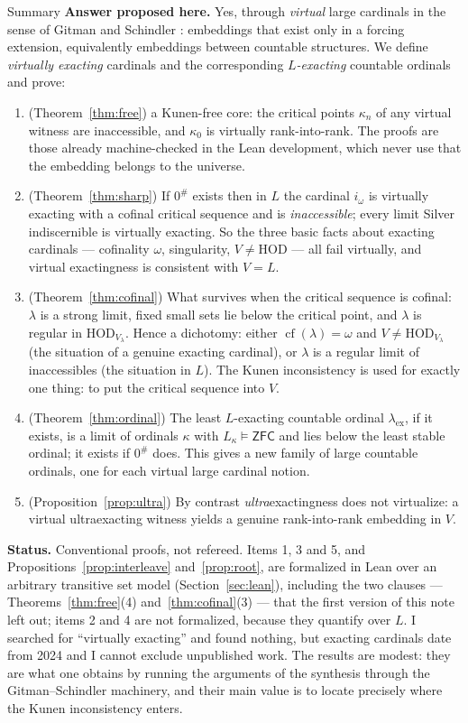 \documentclass[11pt,letterpaper]{article}
\theoremstyle{definition}
\numberwithin{equation}{section}
\newcommand{\ZFC}{\mathsf{ZFC}}
\newcommand{\HOD}{\mathrm{HOD}}
\newcommand{\cf}{\operatorname{cf}}
\begin{document}
\begin{assessment}{Summary}
\textbf{Answer proposed here.} Yes, through \emph{virtual} large cardinals in the sense of Gitman and Schindler \cite{gs}: embeddings that exist only in a forcing extension, equivalently embeddings between countable structures. We define \emph{virtually exacting} cardinals and the corresponding \emph{$L$-exacting} countable ordinals and prove:
\begin{enumerate}[leftmargin=1.6em,itemsep=1pt]
\item (Theorem~\ref{thm:free}) a Kunen-free core: the critical points $\kappa_n$ of any virtual witness are inaccessible, and $\kappa_0$ is virtually rank-into-rank. The proofs are those already machine-checked in the Lean development, which never use that the embedding belongs to the universe.
\item (Theorem~\ref{thm:sharp}) If $0^\#$ exists then in $L$ the cardinal $i_\omega$ is virtually exacting with a cofinal critical sequence and is \emph{inaccessible}; every limit Silver indiscernible is virtually exacting. So the three basic facts about exacting cardinals --- cofinality $\omega$, singularity, $V\ne\HOD$ --- all fail virtually, and virtual exactingness is consistent with $V=L$.
\item (Theorem~\ref{thm:cofinal}) What survives when the critical sequence is cofinal: $\lambda$ is a strong limit, fixed small sets lie below the critical point, and $\lambda$ is regular in $\HOD_{V_\lambda}$. Hence a dichotomy: either $\cf(\lambda)=\omega$ and $V\ne\HOD_{V_\lambda}$ (the situation of a genuine exacting cardinal), or $\lambda$ is a regular limit of inaccessibles (the situation in $L$). The Kunen inconsistency is used for exactly one thing: to put the critical sequence into $V$.
\item (Theorem~\ref{thm:ordinal}) The least $L$-exacting countable ordinal $\lambda_{\mathrm{ex}}$, if it exists, is a limit of ordinals $\kappa$ with $L_\kappa\models\ZFC$ and lies below the least stable ordinal; it exists if $0^\#$ does. This gives a new family of large countable ordinals, one for each virtual large cardinal notion.
\item (Proposition~\ref{prop:ultra}) By contrast \emph{ultra}exactingness does not virtualize: a virtual ultraexacting witness yields a genuine rank-into-rank embedding in $V$.
\end{enumerate}
\textbf{Status.} Conventional proofs, not refereed. Items 1, 3 and 5, and Propositions~\ref{prop:interleave} and~\ref{prop:root}, are formalized in Lean over an arbitrary transitive set model (Section~\ref{sec:lean}), including the two clauses --- Theorems~\ref{thm:free}(4) and~\ref{thm:cofinal}(3) --- that the first version of this note left out; items 2 and 4 are not formalized, because they quantify over $L$. I searched for ``virtually exacting'' and found nothing, but exacting cardinals date from 2024 and I cannot exclude unpublished work. The results are modest: they are what one obtains by running the arguments of the synthesis through the Gitman--Schindler machinery, and their main value is to locate precisely where the Kunen inconsistency enters.
\end{assessment}
\end{document}
